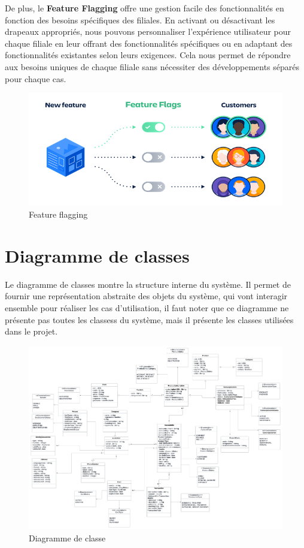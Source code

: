 De plus, le \textbf{Feature Flagging} offre une gestion facile des fonctionnalités en fonction des besoins spécifiques des filiales. En activant ou désactivant les drapeaux appropriés, nous pouvons personnaliser l'expérience utilisateur pour chaque filiale en leur offrant des fonctionnalités spécifiques ou en adaptant des fonctionnalités existantes selon leurs exigences. Cela nous permet de répondre aux besoins uniques de chaque filiale sans nécessiter des développements séparés pour chaque cas.
\begin{figure}[!h]
    \centering %
        \includegraphics[width=14cm]{images/conception/flagging.png}
    \caption{Feature flagging}
\end{figure}

\section{Diagramme de classes}
Le diagramme de classes montre la structure interne du système. Il permet de fournir une
représentation abstraite des objets du système, qui vont interagir ensemble pour réaliser les cas
d’utilisation, il faut noter que ce diagramme ne présente pas toutes les classess du système, mais il présente les classes utilisées dans le projet.\\
\begin{figure}[!h]
    \centering %
        \includegraphics[width=16cm]{images/conception/diagramme_classe.png}
    \caption{Diagramme de classe}
\end{figure}

